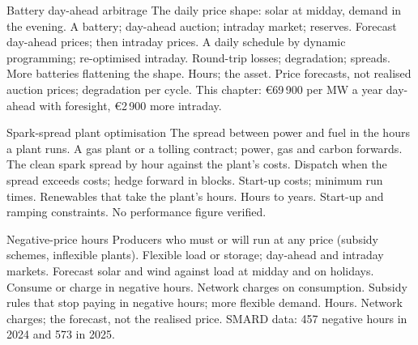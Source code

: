 \begin{strategyfile}{Battery day-ahead arbitrage}\label{strat:s2:power-and-gas-trading:battery}
 The daily price shape: solar at midday, demand in the evening.
 A battery; day-ahead auction; intraday market; reserves.
 Forecast day-ahead prices; then intraday prices.
 A daily schedule by dynamic programming; re-optimised intraday.
 Round-trip losses; degradation; spreads.
 More batteries flattening the shape.
 Hours; the asset.
 Price forecasts, not realised auction prices; degradation per cycle.
 This chapter: \euro69\,900 per MW a year day-ahead with foresight, \euro2\,900 more intraday.
\end{strategyfile}

\begin{strategyfile}{Spark-spread plant optimisation}\label{strat:s2:power-and-gas-trading:plant}
 The spread between power and fuel in the hours a plant runs.
 A gas plant or a tolling contract; power, gas and carbon forwards.
 The clean spark spread by hour against the plant's costs.
 Dispatch when the spread exceeds costs; hedge forward in blocks.
 Start-up costs; minimum run times.
 Renewables that take the plant's hours.
 Hours to years.
 Start-up and ramping constraints.
 No performance figure verified.
\end{strategyfile}

\begin{strategyfile}{Negative-price hours}\label{strat:s2:power-and-gas-trading:negative}
 Producers who must or will run at any price (subsidy schemes, inflexible plants).
 Flexible load or storage; day-ahead and intraday markets.
 Forecast solar and wind against load at midday and on holidays.
 Consume or charge in negative hours.
 Network charges on consumption.
 Subsidy rules that stop paying in negative hours; more flexible demand.
 Hours.
 Network charges; the forecast, not the realised price.
 SMARD data: 457 negative hours in 2024 and 573 in 2025.
\end{strategyfile}


